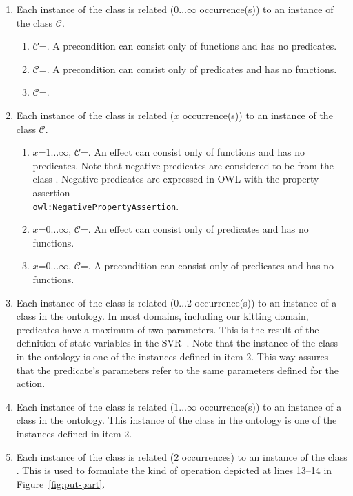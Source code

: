 \begin{enumerate}
  \item Each instance of the class  is related ($0\ldots\infty$ occurrence(s)) to an instance of the class $\mathcal{C}$.
    \begin{enumerate}
      \item $\mathcal{C}$=. A precondition can consist only of functions and has no predicates.
       \item $\mathcal{C}$=. A precondition can consist only of predicates and has no functions.
       \item $\mathcal{C}$=.
    \end{enumerate}
    \item Each instance of the class  is related ($x$ occurrence(s)) to an instance of the class $\mathcal{C}$.
    \begin{enumerate}
      \item $x$=$1\ldots\infty$, $\mathcal{C}$=. An effect can consist only of functions and has no predicates. Note that negative predicates are considered to be from the class . Negative predicates are expressed in OWL with the property assertion\\\texttt{owl:NegativePropertyAssertion}.
      \item $x$=$0\ldots\infty$, $\mathcal{C}$=. An effect can consist only of predicates and has no functions.
      \item $x$=$0\ldots\infty$, $\mathcal{C}$=. A precondition can consist only of predicates and has no functions.
    \end{enumerate}
  \item Each instance of the class  is related ($0\ldots2$ occurrence(s)) to an instance of a class in the  ontology. In most domains, including our kitting domain, predicates have a maximum of two parameters. This is the result of the definition of state variables in the SVR~\cite{BALAKIRSKY.IROS.2012}. Note that the instance of the class in the  ontology is one of the instances defined in item 2. This way assures that the predicate's parameters refer to the same parameters defined for the action.
  \item Each instance of the class  is related ($1\ldots\infty$ occurrence(s)) to an instance of a class in the  ontology. This instance of the class in the  ontology is one of the instances defined in item 2.
    \item Each instance of the class  is related ($2$ occurrences) to an instance of the class . This is used to formulate the kind of operation depicted at lines 13--14 in Figure~\ref{fig:put-part}.
\end{enumerate}

